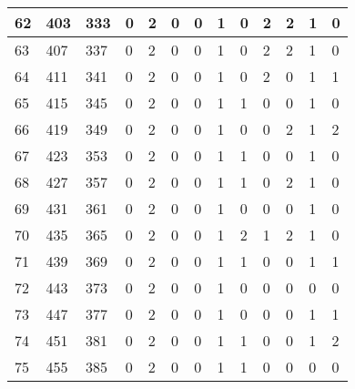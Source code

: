 \begin{sidewaystable}[!h]
\begin{tabular}{|l|l|l|l|l|l|l|l|l|l|l|l|l|}
			62 & 403 & 333 & 0 & 2 & 0 & 0 & 1 & 0 & 2 & 2 & 1 & 0 \\ \hline
			63 & 407 & 337 & 0 & 2 & 0 & 0 & 1 & 0 & 2 & 2 & 1 & 0 \\ \hline
			64 & 411 & 341 & 0 & 2 & 0 & 0 & 1 & 0 & 2 & 0 & 1 & 1 \\ \hline
			65 & 415 & 345 & 0 & 2 & 0 & 0 & 1 & 1 & 0 & 0 & 1 & 0 \\ \hline
			66 & 419 & 349 & 0 & 2 & 0 & 0 & 1 & 0 & 0 & 2 & 1 & 2 \\ \hline
			67 & 423 & 353 & 0 & 2 & 0 & 0 & 1 & 1 & 0 & 0 & 1 & 0 \\ \hline
			68 & 427 & 357 & 0 & 2 & 0 & 0 & 1 & 1 & 0 & 2 & 1 & 0 \\ \hline
			69 & 431 & 361 & 0 & 2 & 0 & 0 & 1 & 0 & 0 & 0 & 1 & 0 \\ \hline
			70 & 435 & 365 & 0 & 2 & 0 & 0 & 1 & 2 & 1 & 2 & 1 & 0 \\ \hline
			71 & 439 & 369 & 0 & 2 & 0 & 0 & 1 & 1 & 0 & 0 & 1 & 1 \\ \hline
			72 & 443 & 373 & 0 & 2 & 0 & 0 & 1 & 0 & 0 & 0 & 0 & 0 \\ \hline
			73 & 447 & 377 & 0 & 2 & 0 & 0 & 1 & 0 & 0 & 0 & 1 & 1 \\ \hline
			74 & 451 & 381 & 0 & 2 & 0 & 0 & 1 & 1 & 0 & 0 & 1 & 2 \\ \hline
			75 & 455 & 385 & 0 & 2 & 0 & 0 & 1 & 1 & 0 & 0 & 0 & 0 \\ \hline
		\end{tabular}
\end{sidewaystable}
\clearpage


